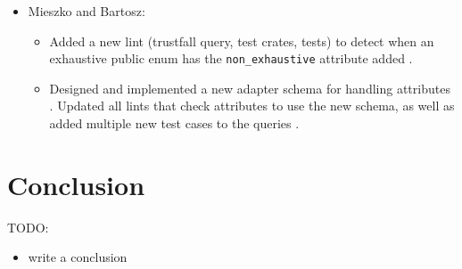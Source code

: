 \documentclass[licencjacka,en]{pracamgr}
\begin{document}
\begin{itemize}
\begin{itemize}

\end{itemize}

	\item Mieszko and Bartosz:
		\begin{itemize}
			\item Added a new lint (trustfall query, test crates, tests) to detect when an exhaustive
				public enum has the \texttt{non\_exhaustive} attribute added \cite{pr_lint_enum_non_exhaustive}.

			\item Designed and implemented a new adapter schema for handling attributes
				\cite{pr_adapter_new_schema_for_attributes}.
				Updated all lints that check attributes to use the new schema, as well as added multiple
				new test cases to the queries \cite{pr_new_schema_for_attributes}.
		\end{itemize}
\end{itemize}


\chapter{Conclusion}\label{r:chapter_conclusion}

TODO:
\begin{itemize}
	\item write a conclusion
\end{itemize}


\appendix
\end{document}
